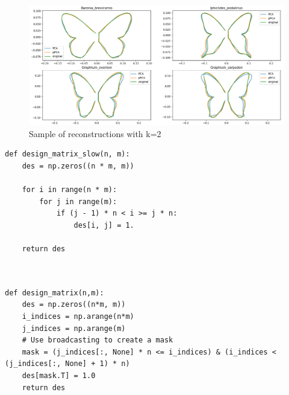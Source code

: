 \documentclass[12pt]{article}
\theoremstyle{definition}
\begin{document}
\begin{figure}[h]
    \begin{center}
        \includegraphics[scale=0.5]{recons-cropped.png}
        \caption{Sample of reconstructions with k=2}
    \end{center}
\end{figure}





\begin{lstlisting}
def design_matrix_slow(n, m):
    des = np.zeros((n * m, m))
    
    for i in range(n * m):
        for j in range(m):
            if (j - 1) * n < i >= j * n:
                des[i, j] = 1.
    
    return des
    
    

\end{lstlisting}


\begin{lstlisting}
def design_matrix(n,m):
    des = np.zeros((n*m, m))
    i_indices = np.arange(n*m)
    j_indices = np.arange(m)
    # Use broadcasting to create a mask
    mask = (j_indices[:, None] * n <= i_indices) & (i_indices < (j_indices[:, None] + 1) * n)
    des[mask.T] = 1.0
    return des

\end{lstlisting}

\printbibliography
\end{document}
